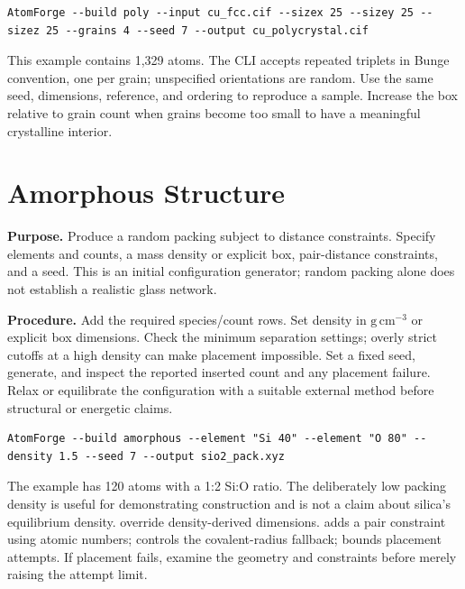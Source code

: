 \begin{lstlisting}
AtomForge --build poly --input cu_fcc.cif --sizex 25 --sizey 25 --sizez 25 --grains 4 --seed 7 --output cu_polycrystal.cif
\end{lstlisting}
This example contains 1,329 atoms. The CLI accepts repeated  triplets in Bunge convention, one per grain; unspecified orientations are random. Use the same seed, dimensions, reference, and ordering to reproduce a sample. Increase the box relative to grain count when grains become too small to have a meaningful crystalline interior.

\section{Amorphous Structure}
\textbf{Purpose.} Produce a random packing subject to distance constraints. Specify elements and counts, a mass density or explicit box, pair-distance constraints, and a seed. This is an initial configuration generator; random packing alone does not establish a realistic glass network.

\textbf{Procedure.} Add the required species/count rows. Set density in $\mathrm{g\,cm^{-3}}$ or explicit box dimensions. Check the minimum separation settings; overly strict cutoffs at a high density can make placement impossible. Set a fixed seed, generate, and inspect the reported inserted count and any placement failure. Relax or equilibrate the configuration with a suitable external method before structural or energetic claims.

\begin{lstlisting}
AtomForge --build amorphous --element "Si 40" --element "O 80" --density 1.5 --seed 7 --output sio2_pack.xyz
\end{lstlisting}
The example has 120 atoms with a 1:2 Si:O ratio. The deliberately low packing density is useful for demonstrating construction and is not a claim about silica's equilibrium density.  override density-derived dimensions.  adds a pair constraint using atomic numbers;  controls the covalent-radius fallback;  bounds placement attempts. If placement fails, examine the geometry and constraints before merely raising the attempt limit.

